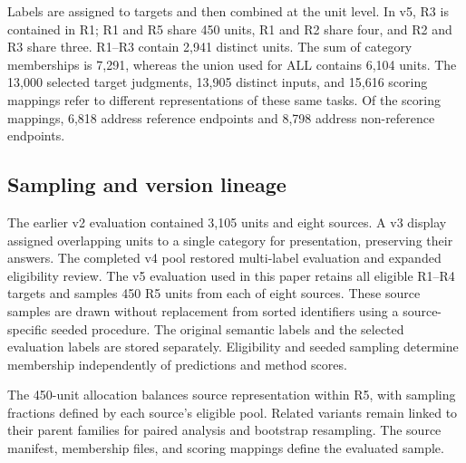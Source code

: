 Labels are assigned to targets and then combined at the unit level. In v5, R3 is contained in R1; R1 and R5 share 450 units, R1 and R2 share four, and R2 and R3 share three. R1--R3 contain 2,941 distinct units. The sum of category memberships is 7,291, whereas the union used for ALL contains 6,104 units. The 13,000 selected target judgments, 13,905 distinct inputs, and 15,616 scoring mappings refer to different representations of these same tasks. Of the scoring mappings, 6,818 address reference endpoints and 8,798 address non-reference endpoints.

\subsection{Sampling and version lineage}
The earlier v2 evaluation contained 3,105 units and eight sources. A v3 display assigned overlapping units to a single category for presentation, preserving their answers. The completed v4 pool restored multi-label evaluation and expanded eligibility review. The v5 evaluation used in this paper retains all eligible R1--R4 targets and samples 450 R5 units from each of eight sources. These source samples are drawn without replacement from sorted identifiers using a source-specific seeded procedure. The original semantic labels and the selected evaluation labels are stored separately. Eligibility and seeded sampling determine membership independently of predictions and method scores.

The 450-unit allocation balances source representation within R5, with sampling fractions defined by each source's eligible pool. Related variants remain linked to their parent families for paired analysis and bootstrap resampling. The source manifest, membership files, and scoring mappings define the evaluated sample.
\FloatBarrier

